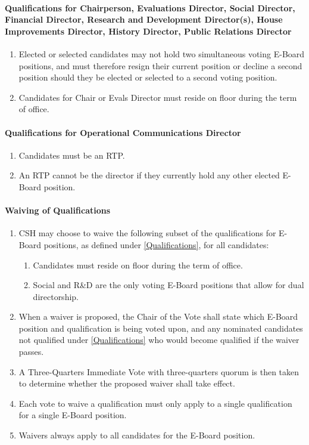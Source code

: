 \documentclass{article}
\newcommand{\asubsubsection}[1]{\paragraph{#1} \label{#1}}
\begin{document}
\asubsubsection{Qualifications for Chairperson, Evaluations Director, Social Director, Financial Director, Research and Development Director(s), House Improvements Director, History Director, Public Relations Director}
\begin{enumerate}
	\item Elected or selected candidates may not hold two simultaneous voting E-Board positions, and must therefore resign their current position or decline a second position should they be elected or selected to a second voting position.
	\item Candidates for Chair or Evals Director must reside on floor during the term of office.
\end{enumerate}

\asubsubsection{Qualifications for Operational Communications Director}
\begin{enumerate}
	\item Candidates must be an RTP.
	\item An RTP cannot be the director if they currently hold any other elected E-Board position. %
\end{enumerate}

\asubsubsection{Waiving of Qualifications}
\begin{enumerate}
	\item CSH may choose to waive the following subset of the qualifications for E-Board positions, as defined under \ref{Qualifications}, for all candidates:
	      \begin{enumerate}
		      \item Candidates must reside on floor during the term of office.
		      \item Social and R\&D are the only voting E-Board positions that allow for dual directorship.
	      \end{enumerate}
	\item When a waiver is proposed, the Chair of the Vote shall state which E-Board position and qualification is being voted upon, and any nominated candidates not qualified under \ref{Qualifications} who would become qualified if the waiver passes.
	\item A Three-Quarters Immediate Vote with three-quarters quorum is then taken to determine whether the proposed waiver shall take effect.
	\item Each vote to waive a qualification must only apply to a single qualification for a single E-Board position.
	\item Waivers always apply to all candidates for the E-Board position.
\end{enumerate}
\end{document}

